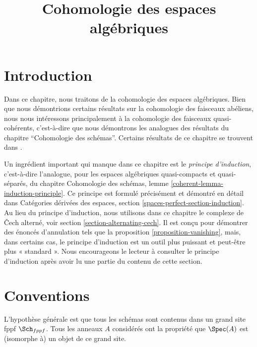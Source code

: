 

%


\title{Cohomologie des espaces algébriques}

\maketitle

\label{section-phantom}

\tableofcontents




\section{Introduction}
\label{section-introduction}

\noindent
Dans ce chapitre, nous traitons de la cohomologie des espaces algébriques.
Bien que nous démontrions certains résultats sur la cohomologie des faisceaux abéliens,
nous nous intéressons principalement à la cohomologie des faisceaux quasi-cohérents, c'est-à-dire
que nous démontrons les analogues des résultats du chapitre ``Cohomologie des schémas''.
Certains résultats de ce chapitre se trouvent dans \cite{Kn}.

\medskip\noindent
Un ingrédient important qui manque dans ce chapitre est le
{\it principe d'induction}, c'est-à-dire l'analogue, pour les espaces algébriques quasi-compacts
et quasi-séparés, du
chapitre Cohomologie des schémas, lemme \ref{coherent-lemma-induction-principle}.
Ce principe est formulé précisément et démontré en détail dans
Catégories dérivées des espaces, section \ref{spaces-perfect-section-induction}.
Au lieu du principe d'induction, nous utilisons dans ce chapitre le
complexe de {\v C}ech alterné, voir
section \ref{section-alternating-cech}.
Il est conçu pour démontrer des énoncés d'annulation tels que
la proposition \ref{proposition-vanishing},
mais, dans certains cas, le principe d'induction est un outil plus puissant
et peut-être plus « standard ». Nous encourageons le lecteur
à consulter le principe d'induction
après avoir lu une partie du contenu de cette section.



\section{Conventions}
\label{section-conventions}

\noindent
L'hypothèse générale est que tous les schémas sont contenus dans
un grand site fppf $\Sch_{fppf}$. Tous les anneaux $A$ considérés
ont la propriété que $\Spec(A)$ est (isomorphe à) un
objet de ce grand site.

